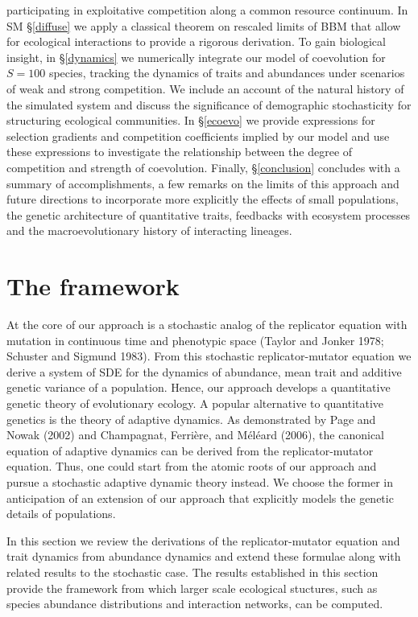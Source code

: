 \documentclass[]{article}
\begin{document}
participating in exploitative competition along a common resource
continuum. In SM \S\ref{diffuse} we apply a classical theorem on
rescaled limits of BBM that allow for ecological interactions to provide
a rigorous derivation. To gain biological insight, in \S\ref{dynamics}
we numerically integrate our model of coevolution for \(S=100\) species,
tracking the dynamics of traits and abundances under scenarios of weak
and strong competition. We include an account of the natural history of
the simulated system and discuss the significance of demographic
stochasticity for structuring ecological communities. In \S\ref{ecoevo}
we provide expressions for selection gradients and competition
coefficients implied by our model and use these expressions to
investigate the relationship between the degree of competition and
strength of coevolution. Finally, \S\ref{conclusion} concludes with a
summary of accomplishments, a few remarks on the limits of this approach
and future directions to incorporate more explicitly the effects of
small populations, the genetic architecture of quantitative traits,
feedbacks with ecosystem processes and the macroevolutionary history of
interacting lineages.

\hypertarget{the-framework}{%
\section{The framework}\label{the-framework}}

At the core of our approach is a stochastic analog of the replicator
equation with mutation in continuous time and phenotypic space (Taylor
and Jonker 1978; Schuster and Sigmund 1983). From this stochastic
replicator-mutator equation we derive a system of SDE for the dynamics
of abundance, mean trait and additive genetic variance of a population.
Hence, our approach develops a quantitative genetic theory of
evolutionary ecology. A popular alternative to quantitative genetics is
the theory of adaptive dynamics. As demonstrated by Page and Nowak
(2002) and Champagnat, Ferrière, and Méléard (2006), the canonical
equation of adaptive dynamics can be derived from the replicator-mutator
equation. Thus, one could start from the atomic roots of our approach
and pursue a stochastic adaptive dynamic theory instead. We choose the
former in anticipation of an extension of our approach that explicitly
models the genetic details of populations.

In this section we review the derivations of the replicator-mutator
equation and trait dynamics from abundance dynamics and extend these
formulae along with related results to the stochastic case. The results
established in this section provide the framework from which larger
scale ecological stuctures, such as species abundance distributions and
interaction networks, can be computed.
\end{document}
